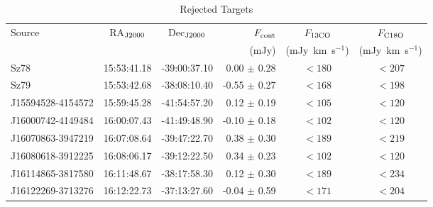 \begin{table}[!htb] 
\caption{Rejected Targets} 
\label{tab-rejected} 
\centering   
\begin{tabular}{lccrcc} 
\hline\hline 
Source & RA$_{\rm J2000}$ & Dec$_{\rm J2000}$ & $F_{\rm cont}$ & $F_{\rm 13CO}$} & $F_{\rm C18O}$ \\ 
 &  &  & (mJy) & (mJy~km~s$^{-1}$) & (mJy~km~s$^{-1}$) \\ 
\hline 
Sz78 & 15:53:41.18 & -39:00:37.10 & 0.00 $\pm$ 0.28 & $< 180$ & $< 207$ \\
Sz79 & 15:53:42.68 & -38:08:10.40 & -0.55 $\pm$ 0.27 & $< 168$ & $< 198$ \\
J15594528-4154572 & 15:59:45.28 & -41:54:57.20 & 0.12 $\pm$ 0.19 & $< 105$ & $< 120$ \\
J16000742-4149484 & 16:00:07.43 & -41:49:48.90 & -0.10 $\pm$ 0.18 & $< 102$ & $< 120$ \\
J16070863-3947219 & 16:07:08.64 & -39:47:22.70 & 0.38 $\pm$ 0.30 & $< 189$ & $< 219$ \\
J16080618-3912225 & 16:08:06.17 & -39:12:22.50 & 0.34 $\pm$ 0.23 & $< 102$ & $< 120$ \\
J16114865-3817580 & 16:11:48.67 & -38:17:58.30 & 0.12 $\pm$ 0.30 & $< 189$ & $< 234$ \\
J16122269-3713276 & 16:12:22.73 & -37:13:27.60 & -0.04 $\pm$ 0.59 & $< 171$ & $< 204$ \\
\hline 
\end{tabular} 
\end{table} 
